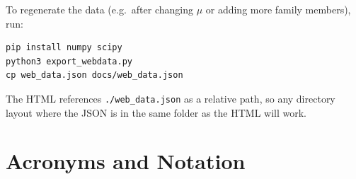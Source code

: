 \documentclass[11pt,a4paper]{article}
\begin{document}
To regenerate the data (e.g.\ after changing $\mu$ or adding more family members), run:
\begin{verbatim}
pip install numpy scipy
python3 export_webdata.py
cp web_data.json docs/web_data.json
\end{verbatim}
The HTML references \texttt{./web\_data.json} as a relative path, so any directory layout where the JSON is in the same folder as the HTML will work.

\section{Acronyms and Notation}\label{sec:acronyms}
\end{document}
